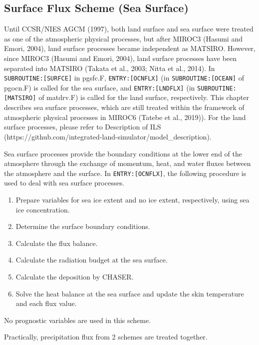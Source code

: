 \hypertarget{surface-flux-scheme-sea-surface}{%
\subsection{Surface Flux Scheme (Sea Surface)}\label{surface-flux-scheme-sea-surface}}

Until CCSR/NIES AGCM (1997), both land surface and sea surface were treated as one of the atmospheric physical processes, but after MIROC3 (Hasumi and Emori, 2004), land surface processes became
independent as MATSIRO. However, since MIROC3 (Hasumi and Emori, 2004), land surface processes have been separated into MATSIRO (Takata et al., 2003; Nitta et al., 2014). In
\texttt{SUBROUTINE:{[}SURFCE{]}} in pgsfc.F, \texttt{ENTRY:{[}OCNFLX{]}} (in \texttt{SUBROUTINE:{[}OCEAN{]}} of pgocn.F) is called for the sea surface, and \texttt{ENTRY:{[}LNDFLX{]}} (in
\texttt{SUBROUTINE:{[}MATSIRO{]}} of matdrv.F) is called for the land surface, respectively. This chapter describes sea surface processes, which are still treated within the framework of atmospheric
physical processes in MIROC6 (Tatebe et al., 2019)). For the land surface processes, please refer to Description of ILS (https://github.com/integrated-land-simulator/model\_description).

Sea surface processes provide the boundary conditions at the lower end of the atmosphere through the exchange of momentum, heat, and water fluxes between the atmosphere and the surface. In
\texttt{ENTRY:{[}OCNFLX{]}}, the following procedure is used to deal with sea surface processes.

\begin{enumerate}
\def\labelenumi{\arabic{enumi}.}
\tightlist
\item
  Prepare variables for sea ice extent and no ice extent, respectively, using sea ice concentration.
\item
  Determine the surface boundary conditions.
\item
  Calculate the flux balance.
\item
  Calculate the radiation budget at the sea surface.
\item
  Calculate the deposition by CHASER.
\item
  Solve the heat balance at the sea surface and update the skin temperature and each flux value.
\end{enumerate}

No prognostic variables are used in this scheme.

Practically, precipitation flux from 2 schemes are treated together.

